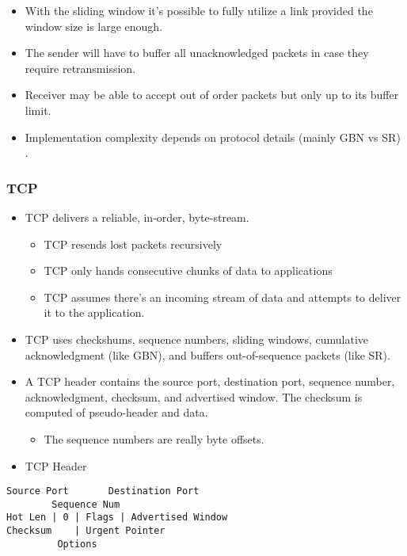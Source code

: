 \documentclass[]{article}
\providecommand{\tightlist}{%
  \setlength{\itemsep}{0pt}\setlength{\parskip}{0pt}}
\begin{document}
\begin{itemize}
  \begin{itemize}
  \tightlist
  \item
    With the sliding window it's possible to fully utilize a link
    provided the window size is large enough.
  \item
    The sender will have to buffer all unacknowledged packets in case
    they require retransmission.
  \item
    Receiver may be able to accept out of order packets but only up to
    its buffer limit.
  \item
    Implementation complexity depends on protocol details (mainly GBN vs
    SR) .
  \end{itemize}
\end{itemize}

\hypertarget{tcp}{%
\subsubsection{TCP}\label{tcp}}

\begin{itemize}
\tightlist
\item
  TCP delivers a reliable, in-order, byte-stream.

  \begin{itemize}
  \tightlist
  \item
    TCP resends lost packets recursively
  \item
    TCP only hands consecutive chunks of data to applications
  \item
    TCP assumes there's an incoming stream of data and attempts to
    deliver it to the application.
  \end{itemize}
\item
  TCP uses checkshums, sequence numbers, sliding windows, cumulative
  acknowledgment (like GBN), and buffers out-of-sequence packets (like
  SR).
\item
  A TCP header contains the source port, destination port, sequence
  number, acknowledgment, checksum, and advertised window. The checksum
  is computed of pseudo-header and data.

  \begin{itemize}
  \tightlist
  \item
    The sequence numbers are really byte offsets.
  \end{itemize}
\item
  TCP Header
\end{itemize}

\begin{verbatim}
Source Port       Destination Port 
        Sequence Num
Hot Len | 0 | Flags | Advertised Window 
Checksum    | Urgent Pointer 
         Options
\end{verbatim}
\end{document}
